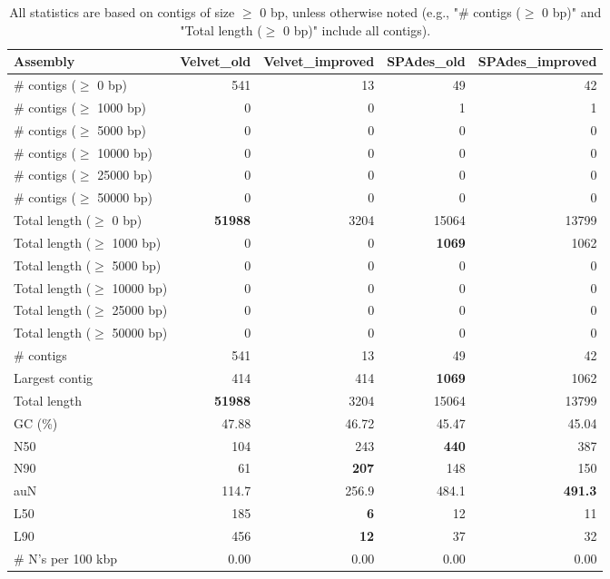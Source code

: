 \documentclass[12pt,a4paper]{article}
\begin{document}
\begin{table}[ht]
\begin{center}
\caption{All statistics are based on contigs of size $\geq$ 0 bp, unless otherwise noted (e.g., "\# contigs ($\geq$ 0 bp)" and "Total length ($\geq$ 0 bp)" include all contigs).}
\begin{tabular}{|l*{4}{|r}|}
\hline
Assembly & Velvet\_old & Velvet\_improved & SPAdes\_old & SPAdes\_improved \\ \hline
\# contigs ($\geq$ 0 bp) & 541 & 13 & 49 & 42 \\ \hline
\# contigs ($\geq$ 1000 bp) & 0 & 0 & 1 & 1 \\ \hline
\# contigs ($\geq$ 5000 bp) & 0 & 0 & 0 & 0 \\ \hline
\# contigs ($\geq$ 10000 bp) & 0 & 0 & 0 & 0 \\ \hline
\# contigs ($\geq$ 25000 bp) & 0 & 0 & 0 & 0 \\ \hline
\# contigs ($\geq$ 50000 bp) & 0 & 0 & 0 & 0 \\ \hline
Total length ($\geq$ 0 bp) & {\bf 51988} & 3204 & 15064 & 13799 \\ \hline
Total length ($\geq$ 1000 bp) & 0 & 0 & {\bf 1069} & 1062 \\ \hline
Total length ($\geq$ 5000 bp) & 0 & 0 & 0 & 0 \\ \hline
Total length ($\geq$ 10000 bp) & 0 & 0 & 0 & 0 \\ \hline
Total length ($\geq$ 25000 bp) & 0 & 0 & 0 & 0 \\ \hline
Total length ($\geq$ 50000 bp) & 0 & 0 & 0 & 0 \\ \hline
\# contigs & 541 & 13 & 49 & 42 \\ \hline
Largest contig & 414 & 414 & {\bf 1069} & 1062 \\ \hline
Total length & {\bf 51988} & 3204 & 15064 & 13799 \\ \hline
GC (\%) & 47.88 & 46.72 & 45.47 & 45.04 \\ \hline
N50 & 104 & 243 & {\bf 440} & 387 \\ \hline
N90 & 61 & {\bf 207} & 148 & 150 \\ \hline
auN & 114.7 & 256.9 & 484.1 & {\bf 491.3} \\ \hline
L50 & 185 & {\bf 6} & 12 & 11 \\ \hline
L90 & 456 & {\bf 12} & 37 & 32 \\ \hline
\# N's per 100 kbp & 0.00 & 0.00 & 0.00 & 0.00 \\ \hline
\end{tabular}
\end{center}
\end{table}
\end{document}
